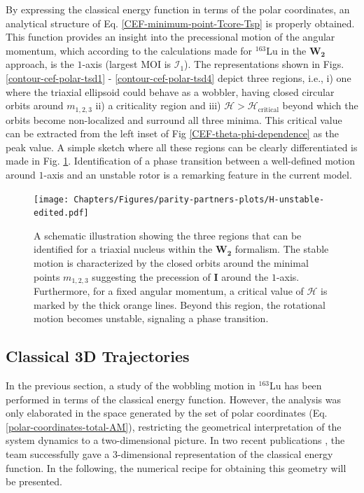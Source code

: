 By expressing the classical energy function in terms of the polar coordinates, an analytical structure of Eq. \ref{CEF-minimum-point-Tcore-Tsp} is properly obtained. This function provides an insight into the precessional motion of the angular momentum, which according to the calculations made for $^{163}$Lu in the $\mathbf{W_2}$ approach, is the $1$-axis (largest MOI is $\mathcal{I}_1$). The representations shown in Figs. \ref{contour-cef-polar-tsd1} - \ref{contour-cef-polar-tsd4} depict three regions, i.e., i) one where the triaxial ellipsoid could behave as a wobbler, having closed circular orbits around $m_{1,2,3}$ ii) a criticality region and iii) $\mathcal{H}>\mathcal{H}_\text{critical}$ beyond which the orbits become non-localized and surround all three minima. This critical value can be extracted from the left inset of Fig \ref{CEF-theta-phi-dependence} as the peak value. A simple sketch where all these regions can be clearly differentiated is made in Fig. \ref{fig-H-unstable-sketch}. Identification of a phase transition between a well-defined motion around $1$-axis and an unstable rotor is a remarking feature in the current model.
\begin{figure}
    \centering
    \texttt{[image: Chapters/Figures/parity-partners-plots/H-unstable-edited.pdf]}
    \caption{A schematic illustration showing the three regions that can be identified for a triaxial nucleus within the $\mathbf{W_2}$ formalism. The stable motion is characterized by the closed orbits around the minimal points $m_{1,2,3}$ suggesting the precession of $\mathbf{I}$ around the $1$-axis. Furthermore, for a fixed angular momentum, a critical value of $\mathcal{H}$ is marked by the thick orange lines. Beyond this region, the rotational motion becomes unstable, signaling a phase transition.}
    \label{fig-H-unstable-sketch}
\end{figure}

\subsection{Classical 3D Trajectories}

In the previous section, a study of the wobbling motion in $^{163}$Lu has been performed in terms of the classical energy function. However, the analysis was only elaborated in the space generated by the set of polar coordinates (Eq. \ref{polar-coordinates-total-AM}), restricting the geometrical interpretation of the system dynamics to a two-dimensional picture. In two recent publications \cite{poenaru2021extensive1,poenaru2021extensive2}, the team successfully gave a $3$-dimensional representation of the classical energy function. In the following, the numerical recipe for obtaining this geometry will be presented.

